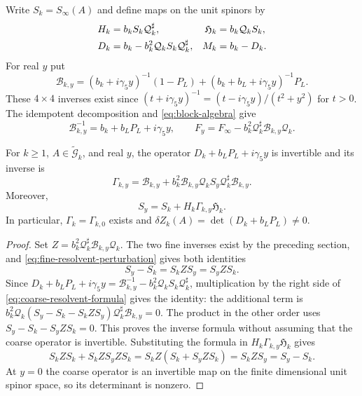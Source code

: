 Write $S_k=S_\infty(A)$ and define maps on the unit spinors by
\begin{align}
 H_k&=b_kS_k\mathcal Q_k^\sharp,&
 \mathfrak H_k&=b_k\mathcal Q_kS_k,\notag\\
 D_k&=b_k-b_k^2\mathcal Q_kS_k\mathcal Q_k^\sharp,&
 M_k&=b_k-D_k.\label{eq:coarse-dirac-definition}
\end{align}
For real $y$ put
\[
 \mathcal B_{k,y}=(b_k+i\gamma_5y)^{-1}(1-P_L)
                   +(b_k+b_L+i\gamma_5y)^{-1}P_L.
\]
These $4\times4$ inverses exist since
$(t+i\gamma_5y)^{-1}=(t-i\gamma_5y)/(t^2+y^2)$ for $t>0$.
The idempotent decomposition and \eqref{eq:block-algebra} give
\begin{equation}\label{eq:fine-resolvent-perturbation}
 \mathcal B_{k,y}^{-1}=b_k+b_LP_L+i\gamma_5y,\qquad
 F_y=F_\infty-b_k^2\mathcal Q_k^\sharp
                       \mathcal B_{k,y}\mathcal Q_k.
\end{equation}

\begin{proposition}\label{prop:fine-coarse-resolvents}
For $k\ge1$, $A\in\widetilde{\mathcal G}_k$, and real $y$, the
operator $D_k+b_LP_L+i\gamma_5y$ is invertible and its inverse is
\begin{equation}\label{eq:coarse-resolvent-formula}
 \Gamma_{k,y}=\mathcal B_{k,y}
       +b_k^2\mathcal B_{k,y}\mathcal Q_kS_y
                         \mathcal Q_k^\sharp\mathcal B_{k,y}.
\end{equation}
Moreover,
\begin{equation}\label{eq:resolved-fine-covariance}
 S_y=S_k+H_k\Gamma_{k,y}\mathfrak H_k.
\end{equation}
In particular, $\Gamma_k=\Gamma_{k,0}$ exists and
$\delta Z_k(A)=\det(D_k+b_LP_L)\ne0$.
\end{proposition}

\begin{proof}
Set $Z=b_k^2\mathcal Q_k^\sharp\mathcal B_{k,y}\mathcal Q_k$.
The two fine inverses exist by the preceding section, and
\eqref{eq:fine-resolvent-perturbation} gives both identities
\[
 S_y-S_k=S_kZS_y=S_yZS_k.
\]
Since $D_k+b_LP_L+i\gamma_5y
=\mathcal B_{k,y}^{-1}-b_k^2\mathcal Q_kS_k\mathcal Q_k^\sharp$,
multiplication by the right side of
\eqref{eq:coarse-resolvent-formula} gives the identity: the additional
term is
$b_k^2\mathcal Q_k(S_y-S_k-S_kZS_y)
\mathcal Q_k^\sharp\mathcal B_{k,y}=0$.
The product in the other order uses $S_y-S_k-S_yZS_k=0$.
This proves the inverse formula without assuming that the coarse
operator is invertible. Substituting the formula in
$H_k\Gamma_{k,y}\mathfrak H_k$ gives
\[
 S_kZS_k+S_kZS_yZS_k
     =S_kZ(S_k+S_yZS_k)=S_kZS_y=S_y-S_k.
\]
At $y=0$ the coarse operator is an invertible map on the finite
dimensional unit spinor space, so its determinant is nonzero.
\end{proof}


